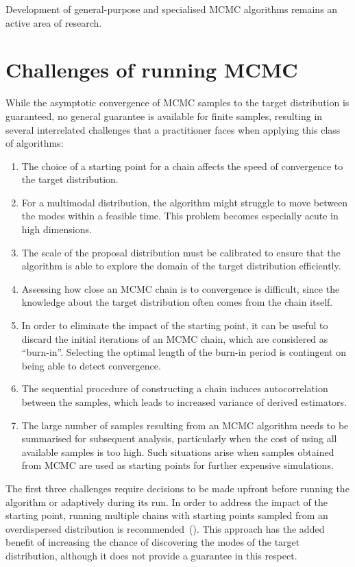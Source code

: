 \documentclass[11pt,a4paper]{report}
\begin{document}
Development of general-purpose and specialised MCMC algorithms remains an active area of research.

\section{Challenges of running MCMC}

While the asymptotic convergence of MCMC samples to the target distribution is guaranteed, no general guarantee is available for finite samples, resulting in several interrelated challenges that a practitioner faces when applying this class of algorithms:
\begin{enumerate}
\item The choice of a starting point for a chain affects the speed of convergence to the target distribution.
\item For a multimodal distribution, the algorithm might struggle to move between the modes within a feasible time. This problem becomes especially acute in high dimensions.
\item The scale of the proposal distribution must be calibrated to ensure that the algorithm is able to explore the domain of the target distribution efficiently.
\item Assessing how close an MCMC chain is to convergence is difficult, since the knowledge about the target distribution often comes from the chain itself.
\item In order to eliminate the impact of the starting point, it can be useful to discard the initial iterations of an MCMC chain, which are considered as ``burn-in''. Selecting the optimal length of the burn-in period is contingent on being able to detect convergence.
\item The sequential procedure of constructing a chain induces autocorrelation between the samples, which leads to increased variance of derived estimators.
\item The large number of samples resulting from an MCMC algorithm needs to be summarised for subsequent analysis, particularly when the cost of using all available samples is too high. Such situations arise when samples obtained from MCMC are used as starting points for further expensive simulations.
\end{enumerate}

The first three challenges require decisions to be made upfront before running the algorithm or adaptively during its run. In order to address the impact of the starting point, running multiple chains with starting points sampled from an overdispersed distribution is recommended~(\cite{gelmanInferenceIterativeSimulation1992}). This approach has the added benefit of increasing the chance of discovering the modes of the target distribution, although it does not provide a guarantee in this respect. 
\end{document}
